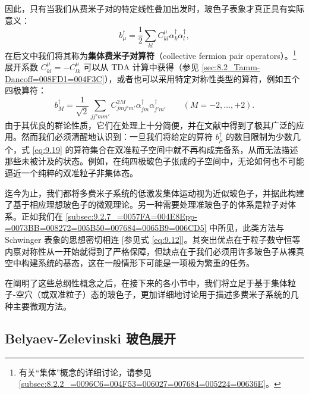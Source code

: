 因此，只有当我们从费米子对的特定线性叠加出发时，玻色子表象才真正具有实际意义：
\begin{equation}
b^{\dagger}_{\mu}=\frac{1}{2}\sum_{kl}C^{\mu}_{kl}\alpha^{\dagger}_{k}\alpha^{\dagger}_{l},\label{eq:9.19}
\end{equation}
在后文中我们将其称为\textbf{集体费米子对算符}（collective fermion pair operators）。\footnote{有关“集体”概念的详细讨论，请参见 \ref{subsec:8.2.2_=0096C6=004F53=006027=007684=005224=00636E}。}展开系数
$C^{\mu}_{kl}=-C^{\mu}_{lk}$ 可以从 TDA 计算中获得（参见 \ref{sec:8.2_Tamm-Dancoff=008FD1=004F3C}），或者也可以采用特定对称性类型的算符，例如五个四极算符：
\begin{equation}
b^{\dagger}_{M}=\frac{1}{\sqrt{2}}\sum_{jj'mm'}C^{2M}_{jmj'm'}\alpha^{\dagger}_{jm}\alpha^{\dagger}_{j'm'}\qquad(M=-2,\ldots,+2).\label{eq:9.20}
\end{equation}
由于其优良的群论性质，它们在处理上十分简便，并在文献中得到了极其广泛的应用。然而我们必须清醒地认识到：一旦我们将给定的算符 $b^{\dagger}_{\mu}$
的数目限制为少数几个，式 \ref{eq:9.19} 的算符集合在双准粒子空间中就不再构成完备系，从而无法描述那些未被计及的状态。例如，在纯四极玻色子张成的子空间中，无论如何也不可能逼近一个纯粹的双准粒子非集体态。

迄今为止，我们都将多费米子系统的低激发集体运动视为近似玻色子，并据此构建了基于相应理想玻色子的微观理论。另一种需要处理准玻色子的体系是粒子对体系。正如我们在
\ref{subsec:9.2.7_=0057FA=004E8Epp-=0073BB=008272=005B50=007684=0065B9=006CD5}
中所见，此类方法与 Schwinger 表象的思想密切相连 {[}参见式 \ref{eq:9.12}{]}。其突出优点在于粒子数守恒等内禀对称性从一开始就得到了严格保障，但缺点在于我们必须用许多玻色子从裸真空中构建系统的基态，这在一般情形下可能是一项极为繁重的任务。

在阐明了这些总纲性概念之后，在接下来的各小节中，我们将立足于基于集体粒子-空穴（或双准粒子）态的玻色子，更加详细地讨论用于描述多费米子系统的几种主要微观方法。

\subsection{Belyaev-Zelevinski 玻色展开\label{subsec:9.2.3_Belyaev-Zelevinski=0073BB=008272=005C55=005F00}}

